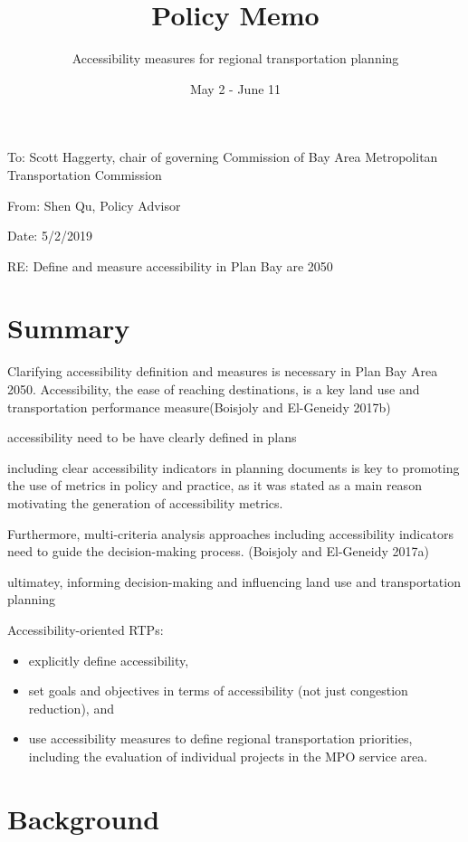 \documentclass[12pt,]{article}
\title{Policy Memo}
\subtitle{Accessibility measures for regional transportation planning}
\author{}
\date{May 2 - June 11}
\begin{document}
\maketitle

To: Scott Haggerty, chair of governing Commission of Bay Area
Metropolitan Transportation Commission

From: Shen Qu, Policy Advisor

Date: 5/2/2019

RE: Define and measure accessibility in Plan Bay are 2050

\hypertarget{summary}{%
\section{Summary}\label{summary}}

Clarifying accessibility definition and measures is necessary in Plan
Bay Area 2050. Accessibility, the ease of reaching destinations, is a
key land use and transportation performance measure(Boisjoly and
El-Geneidy 2017b)

accessibility need to be have clearly defined in plans

including clear accessibility indicators in planning documents is key to
promoting the use of metrics in policy and practice, as it was stated as
a main reason motivating the generation of accessibility metrics.

Furthermore, multi-criteria analysis approaches including accessibility
indicators need to guide the decision-making process. (Boisjoly and
El-Geneidy 2017a)

ultimatey, informing decision-making and influencing land use and
transportation planning

Accessibility-oriented RTPs:

\begin{itemize}
\item
  explicitly define accessibility,
\item
  set goals and objectives in terms of accessibility (not just
  congestion reduction), and
\item
  use accessibility measures to define regional transportation
  priorities, including the evaluation of individual projects in the MPO
  service area.
\end{itemize}

\hypertarget{background}{%
\section{Background}\label{background}}
\end{document}
